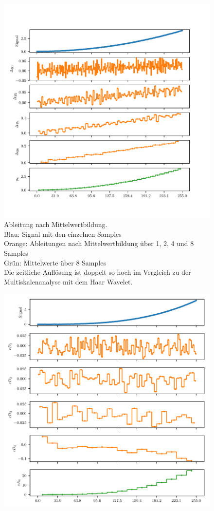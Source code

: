 \begin{refsection}
\begin{figure}
\includegraphics{papers/polynomials/images/polynomials_noise_moving_average.pdf}
\caption{Ableitung nach Mittelwertbildung.\\
Blau: Signal mit den einzelnen Samples\\
Orange: Ableitungen nach Mittelwertbildung über 1, 2, 4 und 8 Samples\\
Grün: Mittelwerte über 8 Samples\\
Die zeitliche Auflösung ist doppelt so hoch im Vergleich zu der
Multiskalenanalyse mit dem Haar Wavelet.\label{polynomials:noise:average}}
\end{figure}
\begin{figure}
\centering
\includegraphics{papers/polynomials/images/polynomials_noise_db2_multi.pdf}

\end{figure}
\end{refsection}
